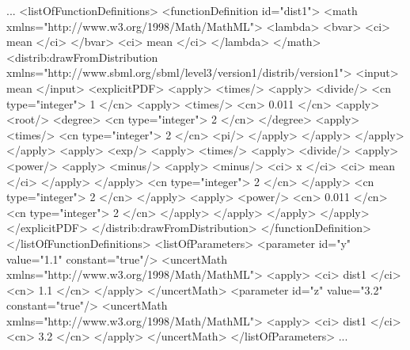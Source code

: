 \documentclass[draftspec]{sbmlpkgspec}
\begin{document}
\begin{example}
...
  <listOfFunctionDefinitions>
    <functionDefinition id="dist1">
      <math xmlns="http://www.w3.org/1998/Math/MathML">
        <lambda>
          <bvar>
            <ci> mean </ci>
          </bvar>
          <ci> mean </ci>
        </lambda>
      </math>
      <distrib:drawFromDistribution
               xmlns="http://www.sbml.org/sbml/level3/version1/distrib/version1">
         <input> mean </input>
         <explicitPDF>
            <apply>
              <times/>
              <apply>
                <divide/>
                <cn type="integer"> 1 </cn>
                <apply>
                  <times/>
                  <cn> 0.011 </cn>
                  <apply>
                    <root/>
                    <degree>
                      <cn type="integer"> 2 </cn>
                    </degree>
                    <apply>
                      <times/>
                      <cn type="integer"> 2 </cn>
                      <pi/>
                    </apply>
                  </apply>
                </apply>
              </apply>
              <apply>
                <exp/>
                <apply>
                  <times/>
                  <apply>
                    <divide/>
                    <apply>
                      <power/>
                      <apply>
                        <minus/>
                        <apply>
                          <minus/>
                          <ci> x </ci>
                          <ci> mean </ci>
                        </apply>
                      </apply>
                      <cn type="integer"> 2 </cn>
                    </apply>
                    <cn type="integer"> 2 </cn>
                  </apply>
                  <apply>
                    <power/>
                    <cn> 0.011 </cn>
                    <cn type="integer"> 2 </cn>
                  </apply>
                </apply>
              </apply>
            </apply>
        </explicitPDF>
      </distrib:drawFromDistribution>
    </functionDefinition>
  </listOfFunctionDefinitions>
  <listOfParameters>
    <parameter id="y" value="1.1" constant="true"/>
      <uncertMath xmlns="http://www.w3.org/1998/Math/MathML">
        <apply>
          <ci> dist1 </ci>
          <cn> 1.1 </cn>
        </apply>
      </uncertMath>
    <parameter id="z" value="3.2" constant="true"/>
      <uncertMath xmlns="http://www.w3.org/1998/Math/MathML">
        <apply>
          <ci> dist1 </ci>
          <cn> 3.2 </cn>
        </apply>
      </uncertMath>
  </listOfParameters>
...
\end{example}
\end{document}
